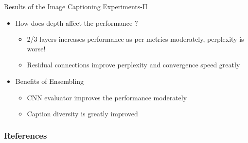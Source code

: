 \documentclass{beamer}
\begin{document}
\begin{frame}{Results of the Image Captioning Experiments-II}
\begin{itemize}
    \item How does depth affect the performance ?
       \begin{itemize}
           \item<1-> 2/3 layers increases performance as per metrics moderately, perplexity is worse!
           \item<1-> Residual connections improve perplexity and convergence speed greatly 
       \end{itemize}
    \item Benefits of Ensembling
       \begin{itemize}
        \item<3-> CNN evaluator improves the performance moderately  
        \item<3-> Caption diversity is greatly improved 
       \end{itemize}
\end{itemize}
\end{frame}
\begin{frame}[allowframebreaks]
        \frametitle{References}
        
\end{frame}
\end{document}
